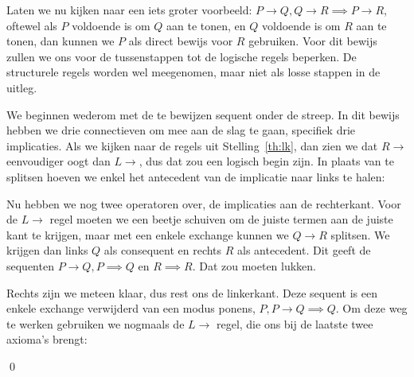 \begin{example}\label{ex:lk:trans}
Laten we nu kijken naar een iets groter voorbeeld: $P \to Q, Q \to R \implies P \to R$, oftewel als $P$ voldoende is om $Q$ aan te tonen, en $Q$ voldoende is om $R$ aan te tonen, dan kunnen we $P$ als direct bewijs voor $R$ gebruiken. Voor dit bewijs zullen we ons voor de tussenstappen tot de logische regels beperken. De structurele regels worden wel meegenomen, maar niet als losse stappen in de uitleg.

\begin{prooftree}
\end{prooftree}

  We beginnen wederom met de te bewijzen sequent onder de streep. In dit bewijs hebben we drie connectieven om mee aan de slag te gaan, specifiek drie implicaties. Als we kijken naar de regels uit Stelling~\ref{th:lk}, dan zien we dat $R\!\to$ eenvoudiger oogt dan $L\!\to$, dus dat zou een logisch begin zijn. In plaats van te splitsen hoeven we enkel het antecedent van de implicatie naar links te halen:

\begin{prooftree}
\end{prooftree}

Nu hebben we nog twee operatoren over, de implicaties aan de rechterkant. Voor de $L\!\to$ regel moeten we een beetje schuiven om de juiste termen aan de juiste kant te krijgen, maar met een enkele exchange kunnen we $Q \to R$ splitsen. We krijgen dan links $Q$ als consequent en rechts $R$ als antecedent. Dit geeft de sequenten $P \to Q, P \implies Q$ en $R \implies R$. Dat zou moeten lukken.

\begin{prooftree}


\end{prooftree}

Rechts zijn we meteen klaar, dus rest ons de linkerkant. Deze sequent is een enkele exchange verwijderd van een modus ponens, $P, P \to Q \implies Q$. Om deze weg te werken gebruiken we nogmaals de $L\to$ regel, die ons bij de laatste twee axioma's brengt:

\begin{prooftree}




\end{prooftree}
\hfill\qed
\end{example}

